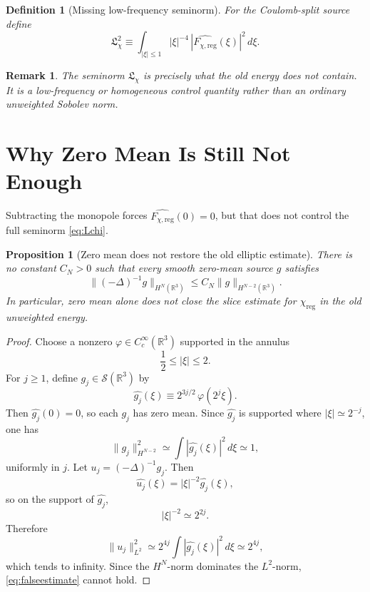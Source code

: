 \documentclass[11pt]{article}
\newtheorem{definition}{Definition}
\newtheorem{proposition}{Proposition}
\newtheorem{remark}{Remark}
\begin{document}
\begin{definition}[Missing low-frequency seminorm]
For the Coulomb-split source define
\begin{equation}
\mathfrak L_\chi^2
\equiv
\int_{|\xi|\le 1}
|\xi|^{-4}\,|\widehat{F_{\chi,\mathrm{reg}}}(\xi)|^2\,d\xi.
\label{eq:Lchi}
\end{equation}
\end{definition}

\begin{remark}
The seminorm \(\mathfrak L_\chi\) is precisely what the old energy does \emph{not} contain. It is a low-frequency or homogeneous control quantity rather than an ordinary unweighted Sobolev norm.
\end{remark}

\section{Why Zero Mean Is Still Not Enough}

Subtracting the monopole forces \(\widehat{F_{\chi,\mathrm{reg}}}(0)=0\), but that does not control the full seminorm \eqref{eq:Lchi}.

\begin{proposition}[Zero mean does not restore the old elliptic estimate]
\label{prop:noestimate}
There is no constant \(C_N>0\) such that every smooth zero-mean source \(g\) satisfies
\begin{equation}
\|(-\Delta)^{-1}g\|_{H^N(\mathbb R^3)}
\le
C_N \|g\|_{H^{N-2}(\mathbb R^3)}.
\label{eq:falseestimate}
\end{equation}
In particular, zero mean alone does not close the slice estimate for \(\chi_{\mathrm{reg}}\) in the old unweighted energy.
\end{proposition}

\begin{proof}
Choose a nonzero \(\varphi\in C_c^\infty(\mathbb R^3)\) supported in the annulus
\[
\frac{1}{2}\le |\xi|\le 2.
\]
For \(j\ge 1\), define \(g_j\in \mathcal S(\mathbb R^3)\) by
\begin{equation}
\widehat{g_j}(\xi)
\equiv
2^{3j/2}\,\varphi(2^j\xi).
\label{eq:gj}
\end{equation}
Then \(\widehat{g_j}(0)=0\), so each \(g_j\) has zero mean. Since \(\widehat{g_j}\) is supported where \(|\xi|\simeq 2^{-j}\), one has
\[
\|g_j\|_{H^{N-2}}^2
\simeq
\int |\widehat{g_j}(\xi)|^2\,d\xi
\simeq
1,
\]
uniformly in \(j\). Let \(u_j=(-\Delta)^{-1}g_j\). Then
\[
\widehat{u_j}(\xi)
=
|\xi|^{-2}\widehat{g_j}(\xi),
\]
so on the support of \(\widehat{g_j}\),
\[
|\xi|^{-2}\simeq 2^{2j}.
\]
Therefore
\[
\|u_j\|_{L^2}^2
\simeq
2^{4j}\int |\widehat{g_j}(\xi)|^2\,d\xi
\simeq
2^{4j},
\]
which tends to infinity. Since the \(H^N\)-norm dominates the \(L^2\)-norm, \eqref{eq:falseestimate} cannot hold.
\end{proof}
\end{document}
